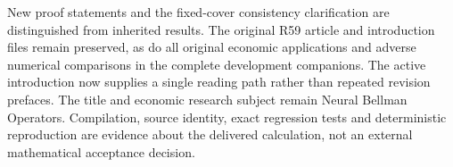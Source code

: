 New proof statements and the fixed-cover consistency clarification are distinguished from inherited results. The original R59 article and introduction files remain preserved, as do all original economic applications and adverse numerical comparisons in the complete development companions. The active introduction now supplies a single reading path rather than repeated revision prefaces. The title and economic research subject remain Neural Bellman Operators. Compilation, source identity, exact regression tests and deterministic reproduction are evidence about the delivered calculation, not an external mathematical acceptance decision.
